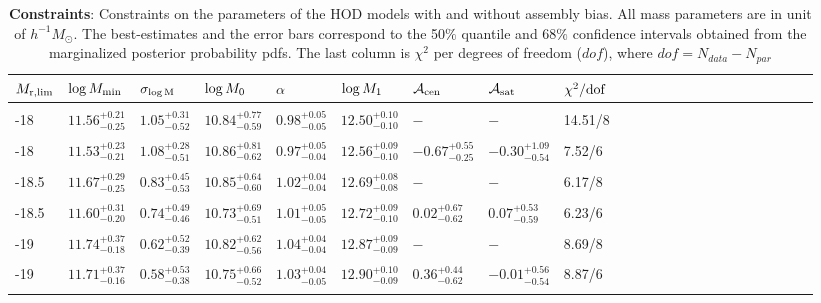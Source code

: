 \begin{table}
\begin{center}
  \label{tab:constraints}
 \caption{{\bf Constraints}: Constraints on the parameters of the HOD models with and without assembly bias. 
All mass parameters are in unit of $h^{-1}M_\odot$. The best-estimates and the error bars correspond to the 50$\%$ quantile and 68$\%$ confidence intervals obtained from the marginalized posterior probability pdfs. The last column is $\chi^{2}$ per degrees of freedom ($dof$), where $dof = N_{data} - N_{par}$}
\begin{tabular}{@{}lllllllllllllllllllllll}
\hline 
   $M_{\rm r,lim}$ & $\log M_{\rm min}$ & $\sigma_{\log \rm M}$ & $\log M_{0}$ & $\alpha$ &  $\log M_{1}$ & $\mathcal{A}_{\rm cen}$ & $\mathcal{A}_{\rm sat}$ & $\chi^{2}/\rm{dof}$ \\  \hline
  \\ 
 -18 & $11.56^{+0.21}_{-0.25}$ &  $1.05^{+0.31}_{-0.52}$ & $10.84^{+0.77}_{-0.59}$ & $0.98^{+0.05}_{-0.05}$ &  $12.50^{+0.10}_{-0.10}$ & $-$ & $-$ & 14.51/8\\\\
     
  -18 & $11.53^{+0.23}_{-0.21}$ &  $1.08^{+0.28}_{-0.51}$ & $10.86^{+0.81}_{-0.62}$ & $0.97^{+0.05}_{-0.04}$ &  $12.56^{+0.09}_{-0.10}$ & $-0.67^{+0.55}_{-0.25}$ & $-0.30^{+1.09}_{-0.54}$ & 7.52/6\\ \\
     
-18.5 & $11.67^{+0.29}_{-0.25}$ &  $0.83^{+0.45}_{-0.53}$ & $10.85^{+0.64}_{-0.60}$ & $1.02^{+0.04}_{-0.04}$ &  $12.69^{+0.08}_{-0.08}$ & $-$ & $-$ & 6.17/8\\ \\
    
-18.5 & $11.60^{+0.31}_{-0.20}$ &  $0.74^{+0.49}_{-0.46}$ & $10.73^{+0.69}_{-0.51}$ & $1.01^{+0.05}_{-0.05}$ &  $12.72^{+0.09}_{-0.10}$ & $0.02^{+0.67}_{-0.62}$ & $0.07^{+0.53}_{-0.59}$ & 6.23/6\\ \\

-19 & $11.74^{+0.37}_{-0.18}$ &  $0.62^{+0.52}_{-0.39}$ & $10.82^{+0.62}_{-0.56}$ & $1.04^{+0.04}_{-0.04}$ &  $12.87^{+0.09}_{-0.09}$ & $-$ & $-$ & 8.69/8\\ \\

-19 & $11.71^{+0.37}_{-0.16}$ &  $0.58^{+0.53}_{-0.38}$ & $10.75^{+0.66}_{-0.52}$ & $1.03^{+0.04}_{-0.05}$ &  $12.90^{+0.10}_{-0.09}$ & $0.36^{+0.44}_{-0.62}$ & $-0.01^{+0.56}_{-0.54}$ & 8.87/6\\ \\


\end{tabular}
\end{center}
\end{table}
